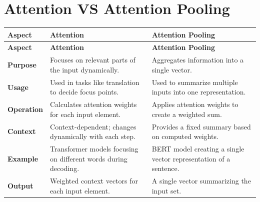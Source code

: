 
\section{Attention VS Attention Pooling \cite{chatgpt}} \label{Attention VS Attention Pooling}

\begin{customTableWrapper}{1.5}
\begin{longtable}{|p{2cm}|p{5cm}|p{5cm}|}
    \hline
    \textbf{Aspect} & \textbf{Attention} & \textbf{Attention Pooling} \\
    \hline
    \endfirsthead
    
    \hline
    \textbf{Aspect} & \textbf{Attention} & \textbf{Attention Pooling} \\
    \hline
    \endhead
    
    \hline
    \endfoot
    
    \hline
    \endlastfoot

    \textbf{Purpose} & Focuses on relevant parts of the input dynamically. & Aggregates information into a single vector. \\
    \hline
    
    \textbf{Usage} & Used in tasks like translation to decide focus points. & Used to summarize multiple inputs into one representation. \\
    \hline
    
    \textbf{Operation} & Calculates attention weights for each input element. & Applies attention weights to create a weighted sum. \\
    \hline
    
    \textbf{Context} & Context-dependent; changes dynamically with each step. & Provides a fixed summary based on computed weights. \\
    \hline
    
    \textbf{Example} & Transformer models focusing on different words during decoding. & BERT model creating a single vector representation of a sentence. \\
    \hline

    \textbf{Output} & Weighted context vectors for each input element. & A single vector summarizing the input set. \\
    \hline

\end{longtable}
\end{customTableWrapper}















